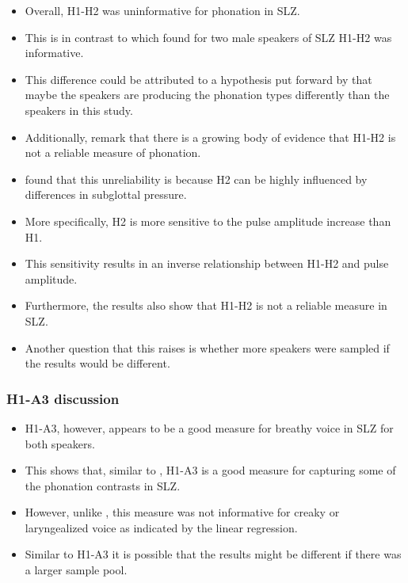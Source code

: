 \documentclass[12pt, letterpaper]{article}
\begin{document}
\begin{itemize}
	\item Overall, H1-H2 was uninformative for phonation in SLZ. 
	\item This is in contrast to \citet{adlerAcousticsPhonationTypes2016} which found for two male speakers of SLZ H1-H2 was informative. 
	\item This difference could be attributed to a hypothesis put forward by \citet{espositoVariationContrastivePhonation2010} that maybe the speakers are producing the phonation types differently than the speakers in this study. 
	\item Additionally, \citet{chaiH1H2Acoustic2022} remark that there is a growing body of evidence that H1-H2 is not a reliable measure of phonation.
	\item \citet{sundbergObjectiveCharacterizationPhonation2022} found that this unreliability is because H2 can be highly influenced by differences in subglottal pressure. 
	\item More specifically, H2 is more sensitive to the pulse amplitude increase than H1. 
	\item This sensitivity results in an inverse relationship between H1-H2 and pulse amplitude.
	\item Furthermore, the results also show that H1-H2 is not a reliable measure in SLZ.
	\item Another question that this raises is whether more speakers were sampled if the results would be different. 
\end{itemize}
\subsubsection{H1-A3 discussion} \label{sec:DiscH1H2}

\begin{itemize}
	\item H1-A3, however, appears to be a good measure for breathy voice in SLZ for both speakers. 
	\item This shows that, similar to \citet{espositoVariationContrastivePhonation2010}, H1-A3 is a good measure for capturing some of the phonation contrasts in SLZ.
	\item However, unlike \citeauthor{espositoVariationContrastivePhonation2010}, this measure was not informative for creaky or laryngealized voice as indicated by the linear regression.
	\item Similar to H1-A3 it is possible that the results might be different if there was a larger sample pool. 
\end{itemize}
\end{document}
